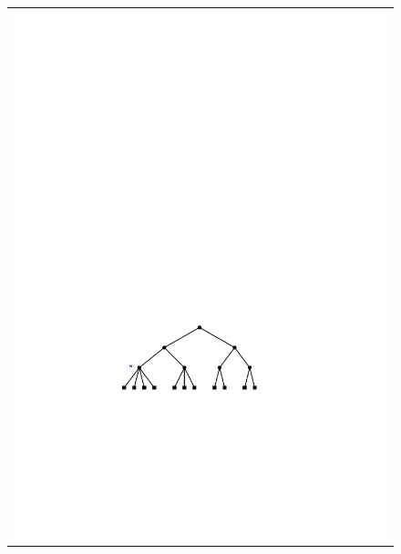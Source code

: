 \begin{figure}
	\begin{center}
		\begin{tabular}{c}
			\includegraphics[scale=0.90909]{figs/24tree-add-1} \\

\end{tabular}
\end{center}
\end{figure}
